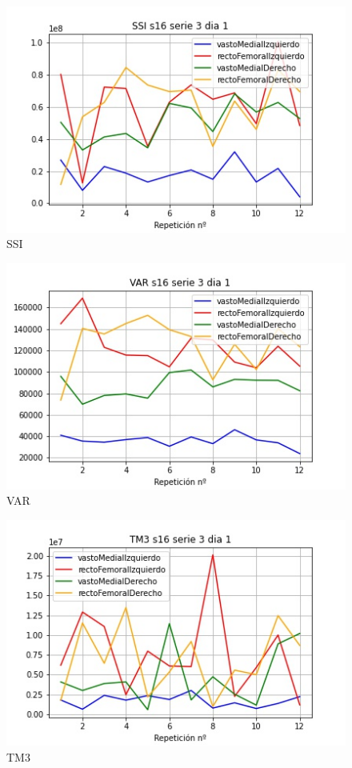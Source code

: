 \begin{figure}[ht]
	\centering
  \includegraphics[width=1.0\textwidth]{imagenes/caracteristicas/SSI s16 serie 3 dia 1.jpg}
  \caption{ SSI}
  \label{fig:ssi}
\end{figure}
\begin{figure}[ht]
	\centering
  \includegraphics[width=1.0\textwidth]{imagenes/caracteristicas/VAR s16 serie 3 dia 1.jpg}
  \caption{ VAR}
  \label{fig:var}
\end{figure}
\begin{figure}[ht]
	\centering
  \includegraphics[width=1.0\textwidth]{imagenes/caracteristicas/TM3 s16 serie 3 dia 1.jpg}
  \caption{ TM3}
  \label{fig:TM3}
\end{figure}

